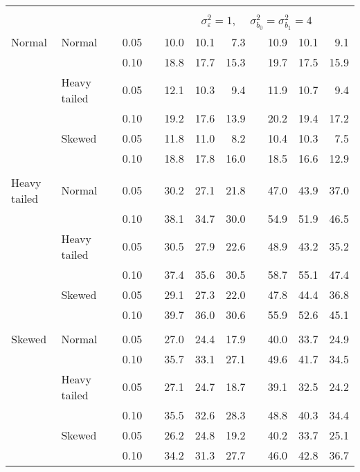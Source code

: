 \begin{table}[ht]
\begin{scriptsize}
\begin{tabular}{ll p{.1cm} c p{.1cm} rrr p{.1cm} rrr}
&&&&&&&&&&&\\
& && && \multicolumn{7}{c}{$\sigma_{\varepsilon}^2 = 1$, \ \ $\sigma_{b_0}^2 = \sigma_{b_1}^2 = 4$} \\ \cline{6-12}
\rowcolor{gray!20} Normal & Normal &  & 0.05 &  & 10.0 & 10.1 & 7.3 &  & 10.9 & 10.1 & 9.1 \\ 
\rowcolor{gray!20}    &  &  & 0.10 &  & 18.8 & 17.7 & 15.3 &  & 19.7 & 17.5 & 15.9 \\ 
\rowcolor{gray!20}    & Heavy tailed &  & 0.05 &  & 12.1 & 10.3 & 9.4 &  & 11.9 & 10.7 & 9.4 \\ 
\rowcolor{gray!20}    &  &  & 0.10 &  & 19.2 & 17.6 & 13.9 &  & 20.2 & 19.4 & 17.2 \\ 
\rowcolor{gray!20}    & Skewed &  & 0.05 &  & 11.8 & 11.0 & 8.2 &  & 10.4 & 10.3 & 7.5 \\ 
\rowcolor{gray!20}    &  &  & 0.10 &  & 18.8 & 17.8 & 16.0 &  & 18.5 & 16.6 & 12.9 \\ 
&&&&&&&&&&&\\
  Heavy tailed & Normal &  & 0.05 &  & 30.2 & 27.1 & 21.8 &  & 47.0 & 43.9 & 37.0 \\ 
   &  &  & 0.10 &  & 38.1 & 34.7 & 30.0 &  & 54.9 & 51.9 & 46.5 \\ 
   & Heavy tailed &  & 0.05 &  & 30.5 & 27.9 & 22.6 &  & 48.9 & 43.2 & 35.2 \\ 
   &  &  & 0.10 &  & 37.4 & 35.6 & 30.5 &  & 58.7 & 55.1 & 47.4 \\ 
   & Skewed &  & 0.05 &  & 29.1 & 27.3 & 22.0 &  & 47.8 & 44.4 & 36.8 \\ 
   &  &  & 0.10 &  & 39.7 & 36.0 & 30.6 &  & 55.9 & 52.6 & 45.1 \\ 
&&&&&&&&&&&\\
  Skewed & Normal &  & 0.05 &  & 27.0 & 24.4 & 17.9 &  & 40.0 & 33.7 & 24.9 \\ 
  &  &  & 0.10 &  & 35.7 & 33.1 & 27.1 &  & 49.6 & 41.7 & 34.5 \\ 
  & Heavy tailed &  & 0.05 &  & 27.1 & 24.7 & 18.7 &  & 39.1 & 32.5 & 24.2 \\ 
  &  &  & 0.10 &  & 35.5 & 32.6 & 28.3 &  & 48.8 & 40.3 & 34.4 \\ 
  & Skewed &  & 0.05 &  & 26.2 & 24.8 & 19.2 &  & 40.2 & 33.7 & 25.1 \\ 
  &  &  & 0.10 &  & 34.2 & 31.3 & 27.7 &  & 46.0 & 42.8 & 36.7 \\ 


\hline
\end{tabular}
\end{scriptsize}
\end{table}



